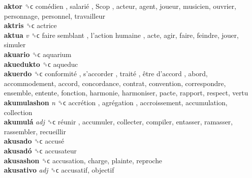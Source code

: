 \textbf{aktor} ␝ϲ   comédien ,  salarié ,  Scop , acteur, agent, joueur, musicien, ouvrier, personnage, personnel, travailleur  \\
\textbf{aktris} ␝ϲ  actrice  \\
\textbf{aktua} \emph{v}  ␝ϲ   faire semblant ,  l’action humaine , acte, agir, faire, feindre, jouer, simuler  \\
\textbf{akuario} ␝ϲ  aquarium  \\
\textbf{akuedukto} ␝ϲ  aqueduc  \\
\textbf{akuerdo} ␝ϲ   conformité ,  s’accorder ,  traité ,  être d’accord , abord, accommodement, accord, concordance, contrat, convention, correspondre, ensemble, entente, fonction, harmonie, harmoniser, pacte, rapport, respect, vertu  \\
\textbf{akumulashon} \emph{n}  ␝ϲ   accrétion ,  agrégation , accroissement, accumulation, collection  \\
\textbf{akumulá} \emph{adj}  ␝ϲ   réunir , accumuler, collecter, compiler, entasser, ramasser, rassembler, recueillir  \\
\textbf{akusado} ␝ϲ   accusé   \\
\textbf{akusadó} ␝ϲ  accusateur  \\
\textbf{akusashon} ␝ϲ  accusation, charge, plainte, reproche  \\
\textbf{akusativo} \emph{adj}  ␝ϲ  accusatif, objectif  \\
